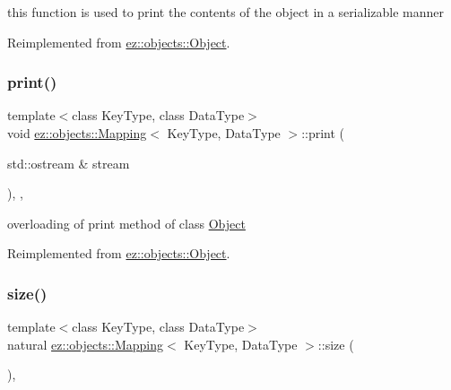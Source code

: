 this function is used to print the contents of the object in a serializable manner 

Reimplemented from \hyperlink{classez_1_1objects_1_1Object_a0fdfe18e6c35d6b0d7e7a01265aded15}{ez\+::objects\+::\+Object}.

\mbox{\label{classez_1_1objects_1_1Mapping_ac30b4bf58f51ea49c8422dfce1e6cf15}} 
\subsubsection{\texorpdfstring{print()}{print()}}
{\footnotesize\ttfamily template$<$class Key\+Type, class Data\+Type$>$ \\
void \hyperlink{classez_1_1objects_1_1Mapping}{ez\+::objects\+::\+Mapping}$<$ Key\+Type, Data\+Type $>$\+::print (\begin{DoxyParamCaption}\item[{std\+::ostream \&}]{stream }\end{DoxyParamCaption})\hspace{0.3cm}{\ttfamily [inline]}, {\ttfamily [override]}, {\ttfamily [virtual]}}

overloading of print method of class \hyperlink{classez_1_1objects_1_1Object}{Object} 

Reimplemented from \hyperlink{classez_1_1objects_1_1Object_a9e20f39a78163f67f000576149d858b3}{ez\+::objects\+::\+Object}.

\mbox{\label{classez_1_1objects_1_1Mapping_a223f5d523a0f3cc3eff5dc7cbf78ce29}} 
\subsubsection{\texorpdfstring{size()}{size()}}
{\footnotesize\ttfamily template$<$class Key\+Type, class Data\+Type$>$ \\
natural \hyperlink{classez_1_1objects_1_1Mapping}{ez\+::objects\+::\+Mapping}$<$ Key\+Type, Data\+Type $>$\+::size (\begin{DoxyParamCaption}{ }\end{DoxyParamCaption})\hspace{0.3cm}{\ttfamily [inline]}, {\ttfamily [virtual]}}

